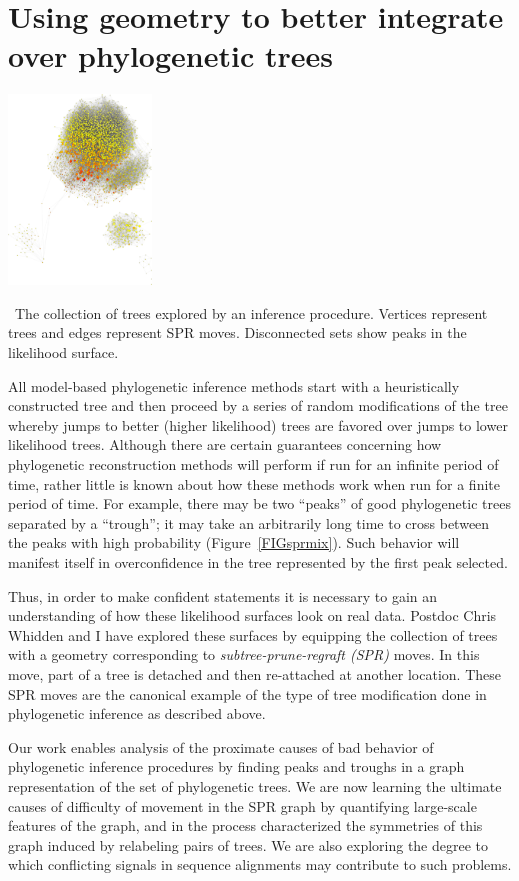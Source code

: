 \documentclass[hyper]{tufte-handout}
\newcommand{\etal}{\textit{et. al.}}
\newcommand{\scite}[3]{\sidenote{\href{#3}{#1 \etal\ #2.}}}
\begin{document}
\section{Using geometry to better integrate over phylogenetic trees}
\begin{marginfigure}%
  \includegraphics[width=1.5in]{ds6_small.png}
  \caption{\
    The collection of trees explored by an inference procedure.
    Vertices represent trees and edges represent SPR moves.
    Disconnected sets show peaks in the likelihood surface.
    }
  \label{FIGsprmix}
\end{marginfigure}
All model-based phylogenetic inference methods start with a heuristically constructed tree and then proceed by a series of random modifications of the tree whereby jumps to better (higher likelihood) trees are favored over jumps to lower likelihood trees.
Although there are certain guarantees concerning how phylogenetic reconstruction methods will perform if run for an infinite period of time, rather little is known about how these methods work when run for a finite period of time.
For example, there may be two ``peaks'' of good phylogenetic trees separated by a ``trough''; it may take an arbitrarily long time to cross between the peaks with high probability (Figure~\ref{FIGsprmix}).
Such behavior will manifest itself in overconfidence in the tree represented by the first peak selected.

Thus, in order to make confident statements it is necessary to gain an understanding of how these likelihood surfaces look on real data.
Postdoc Chris Whidden and I have explored these surfaces by equipping the collection of trees with a geometry corresponding to \textit{subtree-prune-regraft (SPR)} moves.
In this move, part of a tree is detached and then re-attached at another location.
These SPR moves are the canonical example of the type of tree modification done in phylogenetic inference as described above.

Our work enables analysis of the proximate causes of bad behavior of phylogenetic inference procedures by finding peaks and troughs in a graph representation of the set of phylogenetic trees\scite{Whidden}{2014}{http://arxiv.org/abs/1405.2120}.
We are now learning the ultimate causes of difficulty of movement in the SPR graph by quantifying large-scale features of the graph, and in the process characterized the symmetries of this graph induced by relabeling pairs of trees.
We are also exploring the degree to which conflicting signals in sequence alignments may contribute to such problems.
\end{document}
